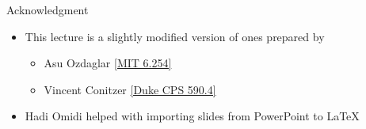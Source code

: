 \documentclass[11pt,aspectratio=169,handout]{beamer}
\begin{document}
  
  \begin{frame}{Acknowledgment}
   \begin{itemize}
   \setlength{\itemsep}{1em}
    \item This lecture is a slightly modified version of ones prepared by
    \begin{itemize}
     \item Asu Ozdaglar \href{https://ocw.mit.edu/courses/electrical-engineering-and-computer-science/6-254-game-theory-with-engineering-applications-spring-2010/index.htm}{[MIT 6.254]}
     \item Vincent Conitzer \href{https://courses.cs.duke.edu/spring16/compsci590.4/}{[Duke CPS 590.4]}
    \end{itemize}
    \item Hadi Omidi helped with importing slides from PowerPoint to \LaTeX
   \end{itemize}
  \end{frame}
\end{document}
